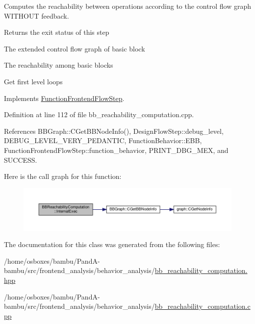 Computes the reachability between operations according to the control flow graph W\+I\+T\+H\+O\+UT feedback. 

\begin{DoxyReturn}{Returns}
the exit status of this step 
\end{DoxyReturn}
The extended control flow graph of basic block

The reachability among basic blocks

Get first level loops 

Implements \hyperlink{classFunctionFrontendFlowStep_a00612f7fb9eabbbc8ee7e39d34e5ac68}{Function\+Frontend\+Flow\+Step}.



Definition at line 112 of file bb\+\_\+reachability\+\_\+computation.\+cpp.



References B\+B\+Graph\+::\+C\+Get\+B\+B\+Node\+Info(), Design\+Flow\+Step\+::debug\+\_\+level, D\+E\+B\+U\+G\+\_\+\+L\+E\+V\+E\+L\+\_\+\+V\+E\+R\+Y\+\_\+\+P\+E\+D\+A\+N\+T\+IC, Function\+Behavior\+::\+E\+BB, Function\+Frontend\+Flow\+Step\+::function\+\_\+behavior, P\+R\+I\+N\+T\+\_\+\+D\+B\+G\+\_\+\+M\+EX, and S\+U\+C\+C\+E\+SS.

Here is the call graph for this function\+:
\nopagebreak
\begin{figure}[H]
\begin{center}
\leavevmode
\includegraphics[width=350pt]{d4/dce/classBBReachabilityComputation_a9bfbe12285b834d001c922e29385a8c6_cgraph}
\end{center}
\end{figure}


The documentation for this class was generated from the following files\+:\begin{DoxyCompactItemize}
\item 
/home/osboxes/bambu/\+Pand\+A-\/bambu/src/frontend\+\_\+analysis/behavior\+\_\+analysis/\hyperlink{bb__reachability__computation_8hpp}{bb\+\_\+reachability\+\_\+computation.\+hpp}\item 
/home/osboxes/bambu/\+Pand\+A-\/bambu/src/frontend\+\_\+analysis/behavior\+\_\+analysis/\hyperlink{bb__reachability__computation_8cpp}{bb\+\_\+reachability\+\_\+computation.\+cpp}\end{DoxyCompactItemize}
